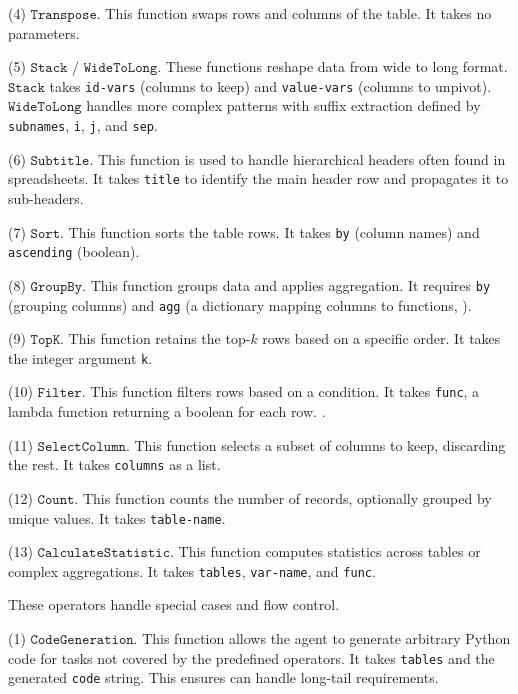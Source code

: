 (4) $\mathtt{Transpose}$.
    This function swaps rows and columns of the table. It takes no parameters.

(5) $\mathtt{Stack}$ / $\mathtt{WideToLong}$.
    These functions reshape data from wide to long format. $\mathtt{Stack}$ takes {\small\texttt{id-vars}} (columns to keep) and {\small\texttt{value-vars}} (columns to unpivot). $\mathtt{WideToLong}$ handles more complex patterns with suffix extraction defined by {\small\texttt{subnames}}, {\small\texttt{i}}, {\small\texttt{j}}, and {\small\texttt{sep}}.

(6) $\mathtt{Subtitle}$.
    This function is used to handle hierarchical headers often found in spreadsheets. It takes {\small\texttt{title}} to identify the main header row and propagates it to sub-headers.

(7) $\mathtt{Sort}$.
    This function sorts the table rows. It takes {\small\texttt{by}} (column names) and {\small\texttt{ascending}} (boolean).

(8) $\mathtt{GroupBy}$.
    This function groups data and applies aggregation. It requires {\small\texttt{by}} (grouping columns) and {\small\texttt{agg}} (a dictionary mapping columns to functions, ).

(9) $\mathtt{TopK}$.
    This function retains the top-$k$ rows based on a specific order. It takes the integer argument {\small\texttt{k}}.

(10) $\mathtt{Filter}$.
    This function filters rows based on a condition. It takes {\small\texttt{func}}, a lambda function returning a boolean for each row. .

(11) $\mathtt{SelectColumn}$.
    This function selects a subset of columns to keep, discarding the rest. It takes {\small\texttt{columns}} as a list.

(12) $\mathtt{Count}$.
    This function counts the number of records, optionally grouped by unique values. It takes {\small\texttt{table-name}}.

(13) $\mathtt{CalculateStatistic}$.
    This function computes statistics across tables or complex aggregations. It takes {\small\texttt{tables}}, {\small\texttt{var-name}}, and {\small\texttt{func}}.

These operators handle special cases and flow control.

(1) $\mathtt{CodeGeneration}$.
    This function allows the agent to generate arbitrary Python code for tasks not covered by the predefined operators. It takes {\small\texttt{tables}} and the generated {\small\texttt{code}} string. This ensures \sys can handle long-tail requirements.

